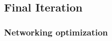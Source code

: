 

























\subsubsection*{}



\subsection[Final Iteration]{Final Iteration}\label{chap:finaliter}






\subsubsection*{Networking optimization}



